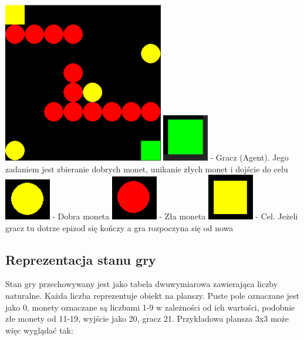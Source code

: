 \documentclass[a4paper,12pt]{article}
\begin{document}
\includegraphics[width=70mm]{przyklad2.png} \newline
\includegraphics[width=20mm]{player.png} - Gracz (Agent). Jego zadaniem jest zbieranie dobrych monet, unikanie złych monet i dojście do celu \newline
\includegraphics[width=20mm]{good_coin.png} - Dobra moneta \newline
\includegraphics[width=20mm]{bad_coin.png} - Zła moneta\newline
\includegraphics[width=20mm]{exit.png} - Cel. Jeżeli gracz tu dotrze epizod się kończy a gra rozpoczyna się od nowa\newline

\subsection{Reprezentacja stanu gry}

Stan gry przechowywany jest jako tabela dwuwymiarowa zawierająca liczby naturalne. Każda liczba reprezentuje obiekt na planszy. Puste pole oznaczane jest jako 0, monety oznaczane są liczbami 1-9 w zależności od ich wartości, podobnie złe monety od 11-19, wyjście jako 20, gracz 21. Przykładowa plansza 3x3 może więc wyglądać tak:
\end{document}
